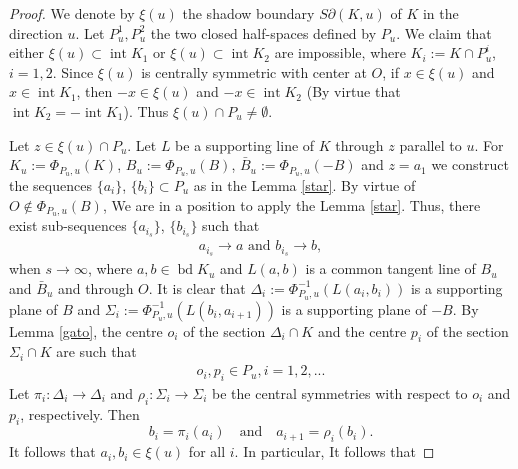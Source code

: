 \documentclass[12pt]{amsart}
\newcommand{\inte}{\operatorname*{int}}
\newcommand{\bd}{\operatorname*{bd}}
\begin{document}
\begin{proof} 
                   We denote by $\xi (u)$ the shadow boundary $S\partial(K,u)$ of $K$ in the direction 
                   $u$. Let $P_u^1,P_u^2$ the two closed half-spaces defined by $P_u$. We claim 
                   that either $\xi(u) \subset \inte K_1$ or $\xi(u) \subset \inte K_2$ are impossible, 
                   where $K_i:=K\cap P_u^i$,  $i=1,2$.   Since $\xi(u)$ is centrally symmetric with 
                   center at $O$, if $x\in \xi(u)$ and $x\in \inte K_1$, then $-x\in \xi(u)$ and 
                   $-x\in \inte K_2$ (By virtue that $\inte K_2=-\inte K_1$). Thus 
                   $\xi(u)\cap P_u\not=\emptyset$. 
 
                    Let $z\in \xi(u)\cap P_u$. Let $L$ be a supporting line of $K$ through $z$ parallel to 
                   $u$. For $K_u:=\Phi_{P_u,u}(K)$, $B_u:=\Phi_{P_u ,u }(B)$, 
                   $\bar{B}_u:=\Phi_{P_u,u}(-B)$ and $z=a_1$ we construct the sequences $\{a_i\}$, 
                   $\{b_i\}\subset P_u$ as in the Lemma \ref{star}. By virtue of $O\notin \Phi_{P_u, u}(B)$, 
                   We are in a position to apply the Lemma \ref{star}. Thus, there exist sub-sequences 
                   $\{a_{i_s}\}$, $\{b_{i_s}\}$ such that
\begin{eqnarray}\label{richard}
                   a_{i_s} \rightarrow a  \textrm{ and } b_{i_s} \rightarrow b,
\end{eqnarray}
                   when $s\rightarrow \infty$, where $a,b\in \bd K_u$ and $L(a,b)$ is a common tangent 
                   line of $B_u$ and $\bar{B}_u$ and through $O$. It is clear that 
                   $\Delta_i:=\Phi_{P_u,u}^{-1}(L(a_{i},b_{i}))$ is a supporting plane of $B$ and 
                   $\Sigma_i:=\Phi_{P_u,u}^{-1}(L(b_{i},a_{i+1}))$ is a supporting plane of $-B$. By 
                   Lemma \ref{gato},  the centre $o_i$ of the section $\Delta_i \cap K$ and the centre $p_i$ of 
                   the section $\Sigma_i \cap K$ are such that                  
                 \begin{eqnarray}\label{deliciosa} 
                  o_i, p_i \in P_u, i=1,2,...
                  \end{eqnarray}
                   Let $\pi_i:\Delta_i \rightarrow \Delta_i$ and $\rho_i:\Sigma_i \rightarrow \Sigma_i$ 
                   be the central symmetries with respect to $o_i$ and $p_i$, respectively. Then
\[
          b_{i}=\pi_i(a_{i}) \textrm{ }\textrm{ and }\textrm{ }a_{i+1}=\rho_i(b_{i}).
\] 
                   It follows that $a_{i},b_{i} \in \xi(u)$ for all $i$. In particular, It follows that 

\end{proof}
\end{document}
